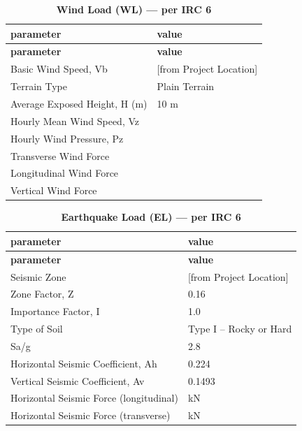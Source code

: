 \documentclass[12pt,a4paper]{report}
\numberwithin{table}{chapter}
\numberwithin{figure}{chapter}
\begin{document}
\vspace{1em}
\begin{longtable}{|L{5.5cm}|p{10.0cm}|}
\caption{\textbf{Wind Load (WL) --- per IRC 6}}
\hline
{} \textbf{parameter} & \textbf{value} \\
\hline
\endfirsthead
\hline
{} \textbf{parameter} & \textbf{value} \\
\hline
\endhead
\textnormal{Basic Wind Speed, Vb} &  [from Project Location] \\[6pt]
\hline
\textnormal{Terrain Type} & Plain Terrain \\[6pt]
\hline
\textnormal{Average Exposed Height, H (m)} & 10 m \\[6pt]
\hline
\textnormal{Hourly Mean Wind Speed, Vz} &  \\[6pt]
\hline
\textnormal{Hourly Wind Pressure, Pz} &  \\[6pt]
\hline
\textnormal{Transverse Wind Force} &  \\[6pt]
\hline
\textnormal{Longitudinal Wind Force} &  \\[6pt]
\hline
\textnormal{Vertical Wind Force} &  \\[6pt]
\hline
\end{longtable}

\vspace{1em}
\begin{longtable}{|L{5.5cm}|p{10.0cm}|}
\caption{\textbf{Earthquake Load (EL) --- per IRC 6}}
\hline
{} \textbf{parameter} & \textbf{value} \\
\hline
\endfirsthead
\hline
{} \textbf{parameter} & \textbf{value} \\
\hline
\endhead
\textnormal{Seismic Zone} &  [from Project Location] \\[6pt]
\hline
\textnormal{Zone Factor, Z} & 0.16 \\[6pt]
\hline
\textnormal{Importance Factor, I} & 1.0 \\[6pt]
\hline
\textnormal{Type of Soil} & Type I – Rocky or Hard \\[6pt]
\hline
\textnormal{Sa/g} & 2.8 \\[6pt]
\hline
\textnormal{Horizontal Seismic Coefficient, Ah} & 0.224 \\[6pt]
\hline
\textnormal{Vertical Seismic Coefficient, Av} & 0.1493 \\[6pt]
\hline
\textnormal{Horizontal Seismic Force (longitudinal)} &  kN \\[6pt]
\hline
\textnormal{Horizontal Seismic Force (transverse)} &  kN \\[6pt]
\hline
\end{longtable}
\end{document}
